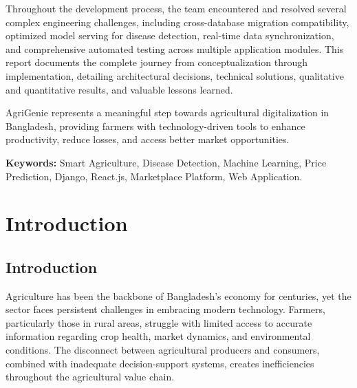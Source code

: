 \documentclass[12pt,a4paper]{report}
\begin{document}
Throughout the development process, the team encountered and resolved several complex engineering challenges, including cross-database migration compatibility, optimized model serving for disease detection, real-time data synchronization, and comprehensive automated testing across multiple application modules. This report documents the complete journey from conceptualization through implementation, detailing architectural decisions, technical solutions, qualitative and quantitative results, and valuable lessons learned.

AgriGenie represents a meaningful step towards agricultural digitalization in Bangladesh, providing farmers with technology-driven tools to enhance productivity, reduce losses, and access better market opportunities.

\vspace{0.5cm}

\textbf{Keywords:} Smart Agriculture, Disease Detection, Machine Learning, Price Prediction, Django, React.js, Marketplace Platform, Web Application.

\newpage

\tableofcontents
\newpage

\listoffigures
\newpage

\listoftables
\newpage

\chapter{Introduction}

\section{Introduction}

Agriculture has been the backbone of Bangladesh's economy for centuries, yet the sector faces persistent challenges in embracing modern technology. Farmers, particularly those in rural areas, struggle with limited access to accurate information regarding crop health, market dynamics, and environmental conditions. The disconnect between agricultural producers and consumers, combined with inadequate decision-support systems, creates inefficiencies throughout the agricultural value chain.
\end{document}
